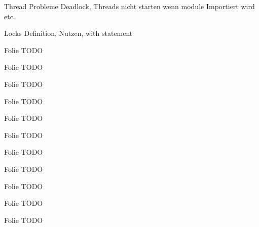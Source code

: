 \begin{frame}{Thread Probleme}
    Deadlock, Threads nicht starten wenn module Importiert wird etc.
\end{frame}

\begin{frame}{Locks}
   Definition, Nutzen, with statement
\end{frame}


\begin{frame}{Folie}
    TODO
\end{frame}

\begin{frame}{Folie}
    TODO
\end{frame}

\begin{frame}{Folie}
    TODO
\end{frame}

\begin{frame}{Folie}
    TODO
\end{frame}

\begin{frame}{Folie}
    TODO
\end{frame}

\begin{frame}{Folie}
    TODO
\end{frame}

\begin{frame}{Folie}
    TODO
\end{frame}

\begin{frame}{Folie}
    TODO
\end{frame}

\begin{frame}{Folie}
    TODO
\end{frame}

\begin{frame}{Folie}
    TODO
\end{frame}

\begin{frame}{Folie}
    TODO
\end{frame}


